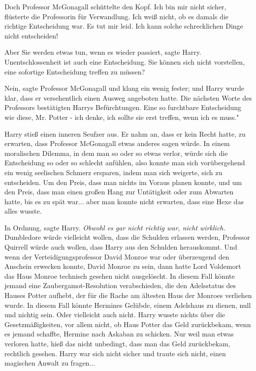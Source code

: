 Doch Professor McGonagall schüttelte den Kopf. \glqq Ich bin mir nicht
sicher\grqq{}, flüsterte die Professorin für Verwandlung. \glqq Ich weiß nicht,
ob es damals die richtige Entscheidung war. Es tut mir leid. Ich kann solche
schrecklichen Dinge nicht entscheiden!\grqq{}

\glqq Aber Sie werden etwas tun, wenn es wieder passiert\grqq{}, sagte Harry.
\glqq Unentschlossenheit ist auch eine Entscheidung. Sie können sich nicht
vorstellen, eine sofortige Entscheidung treffen zu müssen?\grqq{}

\glqq Nein\grqq{}, sagte Professor McGonagall und klang ein wenig fester; und
Harry wurde klar, dass er versehentlich einen Ausweg angeboten hatte. Die
nächsten Worte des Professors bestätigten Harrys Befürchtungen. \glqq Eine so
furchtbare Entscheidung wie diese, Mr. Potter - ich denke, ich sollte sie erst
treffen, wenn ich es muss."

Harry stieß einen inneren Seufzer aus. Er nahm an, dass er kein Recht hatte, zu
erwarten, dass Professor McGonagall etwas anderes sagen würde. In einem
moralischen Dilemma, in dem man so oder so etwas verlor, würde sich die
Entscheidung so oder so schlecht anfühlen, also konnte man sich vorübergehend
ein wenig seelischen Schmerz ersparen, indem man sich weigerte, sich zu
entscheiden. Um den Preis, dass man nichts im Voraus planen konnte, und um den
Preis, dass man einen großen Hang zur Untätigkeit oder zum Abwarten hatte, bis
es zu spät war... aber man konnte nicht erwarten, dass eine Hexe das alles
wusste.

\glqq In Ordnung\grqq{}, sagte Harry. \emph{Obwohl es gar nicht richtig war,
nicht wirklich.} Dumbledore würde vielleicht wollen, dass die Schulden erlassen
werden, Professor Quirrell würde auch wollen, dass Harry aus den Schulden
herauskommt. Und wenn der Verteidigungsprofessor David Monroe war oder
überzeugend den Anschein erwecken konnte, David Monroe zu sein, dann hatte Lord
Voldemort das Haus Monroe technisch gesehen nicht ausgelöscht. In diesem Fall
könnte jemand eine Zaubergamot-Resolution verabschieden, die den Adelsstatus des
Hauses Potter aufhebt, der für die Rache am ältesten Haus der Monroes verliehen
wurde. In diesem Fall könnte Hermines Gelübde, einem Adelshaus zu dienen, null
und nichtig sein. Oder vielleicht auch nicht. Harry wusste nichts über die
Gesetzmäßigkeiten, vor allem nicht, ob Haus Potter das Geld zurückbekam, wenn es
jemand schaffte, Hermine nach Askaban zu schicken. Nur weil man etwas verloren
hatte, hieß das nicht unbedingt, dass man das Geld zurückbekam, rechtlich
gesehen. Harry war sich nicht sicher und traute sich nicht, einen magischen
Anwalt zu fragen...


